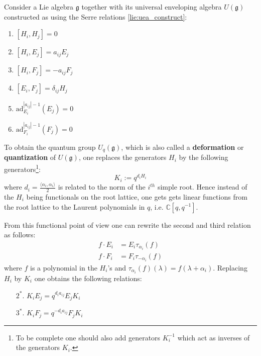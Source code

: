 	\begin{construct}
		Consider a Lie algebra $\mathfrak{g}$ together with its universal enveloping algebra $U(\mathfrak{g})$ constructed as using the Serre relations \ref{lie:uea_construct}:
		\begin{enumerate}
			\item $[H_i, H_j] = 0$
        		\item $[H_i, E_j] = a_{ij}E_j$
        		\item $[H_i, F_j] = -a_{ij}F_j$
			\item $[E_i, F_j] = \delta_{ij}H_j$
        		\item $\text{ad}_{E_i}^{|a_{ij}|-1}(E_j) = 0$
        		\item $\text{ad}_{F_i}^{|a_{ij}|-1}(F_j) = 0$
		\end{enumerate}
		 To obtain the quantum group $U_q(\mathfrak{g})$, which is also called a \textbf{deformation} or \textbf{quantization} of $U(\mathfrak{g})$, one replaces the generators $H_i$ by the following generators\footnote{To be complete one should also add generators $K_i^{-1}$ which act as inverses of the generators $K_i$.}:
		\begin{equation}
			K_i := q^{d_iH_i}
		\end{equation}
		where $d_i = \frac{\langle\alpha_i, \alpha_i\rangle}{2}$ is related to the norm of the $i^{th}$ simple root. Hence instead of the $H_i$ being functionals on the root lattice, one gets gets linear functions from the root lattice to the Laurent polynomials in $q$, i.e. $\mathbb{C}[q, q^{-1}]$.
		
		From this functional point of view one can rewrite the second and third relation as follows:
		\begin{align*}
			f\cdot E_i &= E_i\tau_{\alpha_i}(f)\\
			f\cdot F_i &= F_i\tau_{-\alpha_i}(f)
		\end{align*}
		where $f$ is a polynomial in the $H_i$'s and $\tau_{\alpha_i}(f)(\lambda) = f(\lambda+\alpha_i)$. Replacing $H_i$ by $K_i$ one obtains the following relations:
		\begin{enumerate}
			\item[$2^*.$] $K_iE_j = q^{d_ia_{ij}}E_jK_i$
			\item[$3^*.$] $K_iF_j = q^{-d_ia_{ij}}F_jK_i$
		\end{enumerate}
		

\end{construct}
